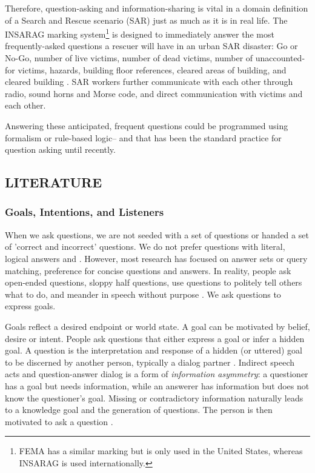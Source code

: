 Therefore, question-asking and information-sharing is vital in a domain definition of a Search and Rescue scenario (SAR) just as much as it is in real life. The INSARAG marking system\footnote{FEMA has a similar marking but is only used in the United States, whereas INSARAG is used internationally.} is designed to immediately answer the most frequently-asked questions a rescuer will have in an urban SAR disaster: Go or No-Go, number of live victims, number of dead victims, number of unaccounted-for victims, hazards, building floor references, cleared areas of building, and cleared building \citet{insarag_2022}. SAR workers further communicate with each other through radio, sound horns and Morse code, and direct communication with victims and each other.

Answering these anticipated, frequent questions could be programmed using formalism or rule-based logic-- and that has been the standard practice for question asking until recently. 


\subsection{LITERATURE}
\subsubsection{Goals, Intentions, and Listeners}
When we ask questions, we are not seeded with a set of questions or handed a set of 'correct and incorrect' questions. We do not prefer questions with literal, logical answers \citet{rothe_lake_gureckis_2017} and \citet{clark_1979}. However, most research has focused on answer sets or query matching, preference for concise
questions and answers. In reality, people ask open-ended questions, sloppy half questions, use questions to politely tell others what to do, and meander in speech without
purpose \citet{brown_1980}. We ask questions to express goals. 

Goals reflect a desired endpoint or world state. A goal can be motivated by belief, desire or intent. People ask questions that either express a goal or infer a hidden goal. 
A question is the interpretation and response of a hidden (or uttered) goal to be discerned
by another person, typically a dialog partner \citet{hawkins_goodman_2017}. Indirect speech acts and question-answer dialog is a form
of \emph{information asymmetry}: a questioner has a goal but needs information,
while an answerer has information but does not know the questioner’s goal. Missing or contradictory information naturally leads to a knowledge goal and the generation of questions. The person is then motivated to ask a question \citet{alaimi_2020}. 

